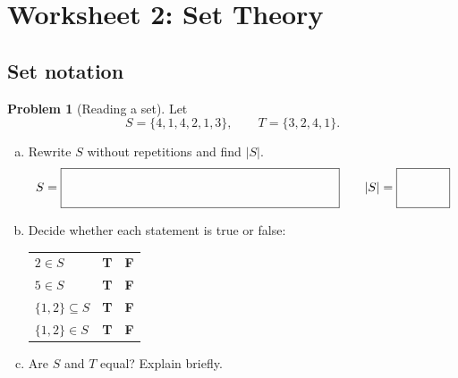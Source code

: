 \documentclass[10pt]{amsart}
\theoremstyle{definition}
\newtheorem{problem}{Problem}
\newcommand{\inlineanswerbox}[1][3in]{%
  \ensuremath{%
    \vcenter{\hbox{%
        \fbox{\rule{0pt}{0.35in}\hspace{#1}}%
      }}%
  }%
}
\begin{document}
\thispagestyle{empty}

\section*{Worksheet 2: Set Theory}

\subsection{Set notation}

\begin{problem}[Reading a set]
  Let
  \begin{equation*}
    S=\{4,1,4,2,1,3\},
    \qquad
    T=\{3,2,4,1\}.
  \end{equation*}

  \begin{enumerate}[(a)]
    \item Rewrite $S$ without repetitions and find $|S|$.
    \begin{equation*}
      S = \inlineanswerbox \qquad |S| = \inlineanswerbox[.5in]
    \end{equation*}

    \item Decide whether each statement is true or false:
    \begin{center}
      \renewcommand{\arraystretch}{1.4}
      \begin{tabular}{l@{\qquad}cc}
        $2\in S$              & \textbf{T} & \textbf{F}\\
        $5\in S$              & \textbf{T} & \textbf{F}\\
        $\{1,2\}\subseteq S$  & \textbf{T} & \textbf{F}\\
        $\{1,2\}\in S$        & \textbf{T} & \textbf{F}
      \end{tabular}
    \end{center}

    \item Are $S$ and $T$ equal? Explain briefly.
    \vspace{1in}
  \end{enumerate}
\end{problem}
\end{document}
